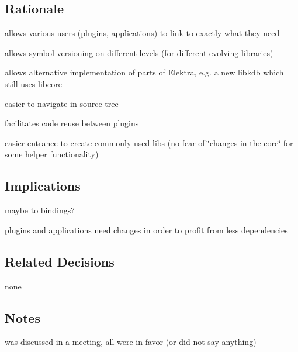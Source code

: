 \subsection*{Rationale}


\begin{DoxyItemize}
\item allows various users (plugins, applications) to link to exactly what they need
\item allows symbol versioning on different levels (for different evolving libraries)
\item allows alternative implementation of parts of Elektra, e.\+g. a new libkdb which still uses libcore
\item easier to navigate in source tree
\item facilitates code reuse between plugins
\item easier entrance to create commonly used libs (no fear of \char`\"{}changes in the core\char`\"{} for some helper functionality)
\end{DoxyItemize}

\subsection*{Implications}


\begin{DoxyItemize}
\item maybe to bindings?
\item plugins and applications need changes in order to profit from less dependencies
\end{DoxyItemize}

\subsection*{Related Decisions}


\begin{DoxyItemize}
\item none
\end{DoxyItemize}

\subsection*{Notes}


\begin{DoxyItemize}
\item was discussed in a meeting, all were in favor (or did not say anything)
\end{DoxyItemize}

